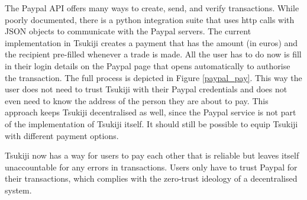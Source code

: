 \newpage

The Paypal API offers many ways to create, send, and verify transactions.
While poorly documented, there is a python integration suite that uses http calls with JSON objects to communicate with the Paypal servers.
The current implementation in Tsukiji creates a payment that has the amount (in euros) and the recipient pre-filled whenever a trade is made.
All the user has to do now is fill in their login details on the Paypal page that opens automatically to authorise the transaction.
The full process is depicted in Figure \ref{paypal_pay}.
This way the user does not need to trust Tsukiji with their Paypal credentials and does not even need to know the address of the person they are about to pay.
This approach keeps Tsukiji decentralised as well, since the Paypal service is not part of the implementation of Tsukiji itself.
It should still be possible to equip Tsukiji with different payment options.

Tsukiji now has a way for users to pay each other that is reliable but leaves itself unaccountable for any errors in transactions.
Users only have to trust Paypal for their transactions, which complies with the zero-trust ideology of a decentralised system.
